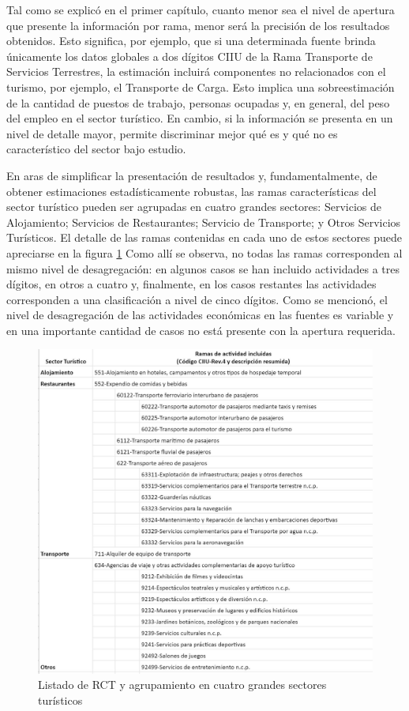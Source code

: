 \documentclass[
  openany]{book}
\begin{document}
Tal como se explicó en el primer capítulo, cuanto menor sea el nivel de apertura que presente la información por rama, menor será la precisión de los resultados obtenidos.
Esto significa, por ejemplo, que si una determinada fuente brinda únicamente los datos globales a dos dígitos CIIU de la Rama Transporte de Servicios Terrestres, la estimación incluirá componentes no relacionados con el turismo, por ejemplo, el Transporte de Carga.
Esto implica una sobreestimación de la cantidad de puestos de trabajo, personas ocupadas y, en general, del peso del empleo en el sector turístico.
En cambio, si la información se presenta en un nivel de detalle mayor, permite discriminar mejor qué es y qué no es característico del sector bajo estudio.

En aras de simplificar la presentación de resultados y, fundamentalmente, de obtener estimaciones estadísticamente robustas, las ramas características del sector turístico pueden ser agrupadas en cuatro grandes sectores: Servicios de Alojamiento; Servicios de Restaurantes; Servicio de Transporte; y Otros Servicios Turísticos.
El detalle de las ramas contenidas en cada uno de estos sectores puede apreciarse en la figura \ref{fig:empleofuentes4} Como allí se observa, no todas las ramas corresponden al mismo nivel de desagregación: en algunos casos se han incluido actividades a tres dígitos, en otros a cuatro y, finalmente, en los casos restantes las actividades corresponden a una clasificación a nivel de cinco dígitos.
Como se mencionó, el nivel de desagregación de las actividades económicas en las fuentes es variable y en una importante cantidad de casos no está presente con la apertura requerida.

\begin{figure}

{\centering \includegraphics[width=0.8\linewidth]{imagenes/figura3.4} 

}

\caption{Listado de RCT y agrupamiento en cuatro grandes sectores turísticos}\label{fig:empleofuentes4}
\end{figure}
\end{document}
